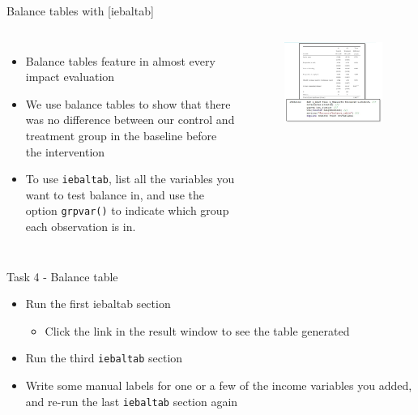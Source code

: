 \documentclass[aspectratio=169]{beamer}
\begin{document}
\begin{frame}[fragile]{Balance tables with [iebaltab]}
	\begin{columns}[c]
		\begin{itemize}
			\item Balance tables feature in almost every impact evaluation
			\item We use balance tables to show that there was no difference between our control and treatment group in the baseline before the intervention
			\item To use \texttt{iebaltab}, list all the variables you want to test balance in, and use the option \texttt{grpvar()} to indicate which group each observation is in.
		\end{itemize}
		\begin{figure}
			\centering
			\includegraphics[width=\linewidth]{img/iedbaltab}
		\end{figure}
	\end{columns}
\end{frame}

\begin{frame}{Task 4 - Balance table}
	\begin{itemize}
		\item Run the first iebaltab section
		\begin{itemize}
			\item Click the link in the result window to see the table generated
		\end{itemize}
		\item Run the third \texttt{iebaltab} section
		\item Write some manual labels for one or a few of the income variables you added, and re-run the last \texttt{iebaltab} section again
	\end{itemize}
\end{frame}
\end{document}
